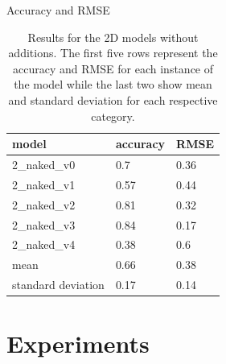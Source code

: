 \documentclass[compress]{beamer}
\begin{document}
	\begin{frame}{Accuracy and RMSE}
		\begin{table}[!htb]
			\centering
			\caption{Results for the 2D models without additions. The first five rows represent the accuracy and RMSE for each instance of the model while the last two show mean and standard deviation for each respective category.}
			\begin{tabularx}{\textwidth}{ X  X  X }
				\hline
				model & accuracy & RMSE \\ 
				\hline
				2\_naked\_v0 & 0.7 & 0.36\\
				2\_naked\_v1 & 0.57 & 0.44\\
				2\_naked\_v2 & 0.81 & 0.32 \\
				2\_naked\_v3 & 0.84 & 0.17 \\
				2\_naked\_v4 & 0.38 & 0.6 \\ 
				\hline
				mean & 0.66 & 0.38 \\
				standard deviation & 0.17 & 0.14 \\
				\hline
			\end{tabularx}
			\label{table:2_naked}
		\end{table}
	\end{frame}
	\section{Experiments}
\end{document}
